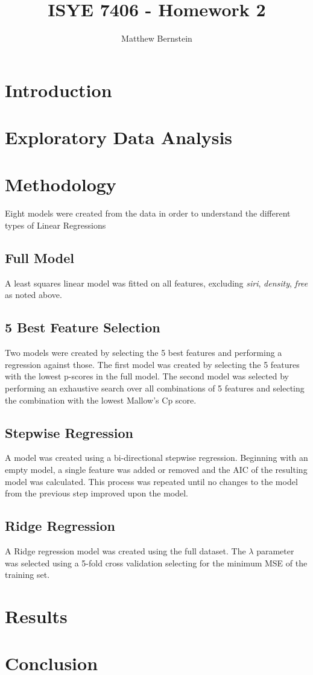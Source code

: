 \documentclass[12pt,letterpaper]{article}
\title{ISYE 7406 - Homework 2}
\author{Matthew Bernstein}
\begin{document}
\maketitle
\section*{Introduction}

\section*{Exploratory Data Analysis}

\section*{Methodology}

Eight models were created from the data in order to understand the different types of Linear Regressions

\subsection*{Full Model}
A least squares linear model was fitted on all features, excluding \textit{siri}, \textit{density}, \textit{free} as noted above.

\subsection*{5 Best Feature Selection}
Two models were created by selecting the 5 best features and performing a regression against those. The first model was created by selecting the 5 features with the lowest p-scores in the full model. The second model was selected by performing an exhaustive search over all combinations of 5 features and selecting the combination with the lowest Mallow's Cp score. 

\subsection*{Stepwise Regression}
A model was created using a bi-directional stepwise regression. Beginning with an empty model, a single feature was added or removed and the AIC of the resulting model was calculated. This process was repeated until no changes to the model from the previous step improved upon the model. 

\subsection*{Ridge Regression}
A Ridge regression model was created using the full dataset. The $\lambda$ parameter was selected using a 5-fold cross validation selecting for the minimum MSE of the training set.

\section*{Results}

\section*{Conclusion}
\end{document}
